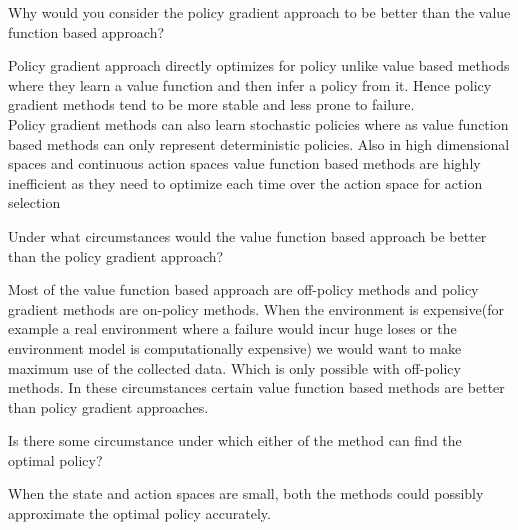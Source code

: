 \documentclass[solution,addpoints,12pt]{exam}
\begin{document}
\begin{questions}
 \begin{enumerate}[label=(\alph*)]
     \question[2]  Why would you consider the policy gradient approach to be better than the value function based approach?
     \begin{solution}
        Policy gradient approach directly optimizes for policy unlike value based methods where they learn a value function and then infer a policy from it. Hence policy gradient methods tend to be more stable and less prone to failure.\\
        Policy gradient methods can also learn stochastic policies where as value function based methods can only represent deterministic policies. Also in high dimensional spaces and continuous action spaces value function based methods are highly inefficient as they need to optimize each time over the action space for action selection 
     \end{solution}
     \question[2]  Under what circumstances would the value function based approach be better than the policy gradient approach?
     \begin{solution}
        Most of the value function based approach are off-policy methods and policy gradient methods are on-policy methods. When the environment is expensive(for example a real environment where a failure would incur huge loses or the environment model is computationally expensive) we would want to make maximum use of the collected data. Which is only possible with off-policy methods. In these circumstances certain value function based methods are better than policy gradient approaches.
     \end{solution}
     \question[2]  Is there some circumstance under which either of the method can find the optimal policy?
     \begin{solution}
     When the state and action spaces are small, both the methods could possibly approximate the optimal policy accurately.
     \end{solution}
 
 \end{enumerate}
 


\end{questions}
\end{document}
